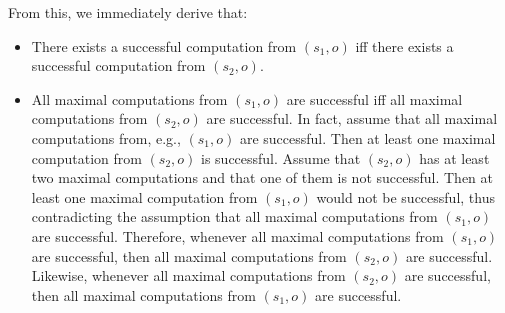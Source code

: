 \documentclass{LMCS}
\begin{document}
\begin{thm}
\begin{enumerate}
\begin{itemize}
			\end{itemize}

\noindent
From this, we immediately derive that:

			\begin{itemize}

\item There exists a successful computation from $(s_{1}, o)$ iff there exists a successful computation from
$(s_{2}, o)$.

\item All maximal computations from $(s_{1}, o)$ are successful iff all maximal computations from $(s_{2},
o)$ are successful. In fact, assume that all maximal computations from, e.g., $(s_{1}, o)$ are successful.
Then at least one maximal computation from $(s_{2}, o)$ is successful. Assume that $(s_{2}, o)$ has at least
two maximal computations and that one of them is not successful. Then at least one maximal computation from
$(s_{1}, o)$ would not be successful, thus contradicting the assumption that all maximal computations from
$(s_{1}, o)$ are successful. Therefore, whenever all maximal computations from $(s_{1}, o)$ are successful,
then all maximal computations from $(s_{2}, o)$ are successful. Likewise, whenever all maximal computations
from $(s_{2}, o)$ are successful, then all maximal computations from $(s_{1}, o)$ are successful.

			\end{itemize}


\end{enumerate}
\end{thm}
\end{document}
